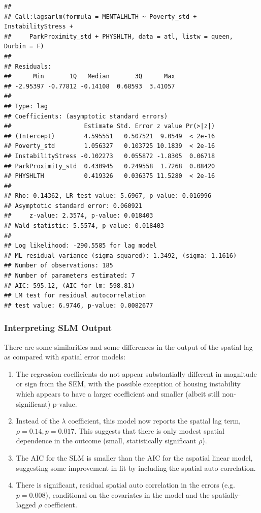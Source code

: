 \documentclass[
]{book}
\providecommand{\tightlist}{%
  \setlength{\itemsep}{0pt}\setlength{\parskip}{0pt}}
\begin{document}
\begin{verbatim}
## 
## Call:lagsarlm(formula = MENTALHLTH ~ Poverty_std + InstabilityStress + 
##     ParkProximity_std + PHYSHLTH, data = atl, listw = queen,     Durbin = F)
## 
## Residuals:
##      Min       1Q   Median       3Q      Max 
## -2.95397 -0.77812 -0.14108  0.68593  3.41057 
## 
## Type: lag 
## Coefficients: (asymptotic standard errors) 
##                    Estimate Std. Error z value Pr(>|z|)
## (Intercept)        4.595551   0.507521  9.0549  < 2e-16
## Poverty_std        1.056327   0.103725 10.1839  < 2e-16
## InstabilityStress -0.102273   0.055872 -1.8305  0.06718
## ParkProximity_std  0.430945   0.249558  1.7268  0.08420
## PHYSHLTH           0.419326   0.036375 11.5280  < 2e-16
## 
## Rho: 0.14362, LR test value: 5.6967, p-value: 0.016996
## Asymptotic standard error: 0.060921
##     z-value: 2.3574, p-value: 0.018403
## Wald statistic: 5.5574, p-value: 0.018403
## 
## Log likelihood: -290.5585 for lag model
## ML residual variance (sigma squared): 1.3492, (sigma: 1.1616)
## Number of observations: 185 
## Number of parameters estimated: 7 
## AIC: 595.12, (AIC for lm: 598.81)
## LM test for residual autocorrelation
## test value: 6.9746, p-value: 0.0082677
\end{verbatim}

\hypertarget{interpreting-slm-output}{%
\subsubsection{Interpreting SLM Output}\label{interpreting-slm-output}}

There are some similarities and some differences in the output of the spatial lag as compared with spatial error models:

\begin{enumerate}
\def\labelenumi{\arabic{enumi}.}
\tightlist
\item
  The regression coefficients do not appear substantially different in magnitude or sign from the SEM, with the possible exception of housing instability which appears to have a larger coefficient and smaller (albeit still non-significant) p-value.
\item
  Instead of the \(\lambda\) coefficient, this model now reports the spatial lag term, \(\rho=0.14, p = 0.017\). This suggests that there is only modest spatial dependence in the outcome (small, statistically significant \(\rho\)).
\item
  The AIC for the SLM is smaller than the AIC for the aspatial linear model, suggesting some improvement in fit by including the spatial auto correlation.
\item
  There is significant, residual spatial auto correlation in the errors (e.g.~\(p=0.008\)), conditional on the covariates in the model and the spatially-lagged \(\rho\) coefficient.
\end{enumerate}
\end{document}
